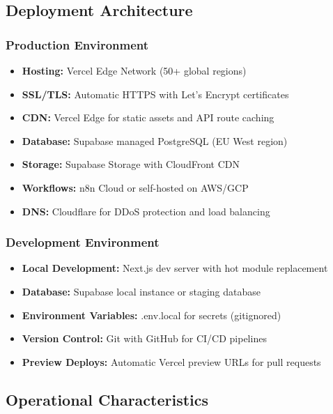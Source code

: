 \documentclass[11pt,a4paper]{article}
\begin{document}
\subsection{Deployment Architecture}

\subsubsection{Production Environment}

\begin{itemize}
  \item \textbf{Hosting:} Vercel Edge Network (50+ global regions)
  \item \textbf{SSL/TLS:} Automatic HTTPS with Let's Encrypt certificates
  \item \textbf{CDN:} Vercel Edge for static assets and API route caching
  \item \textbf{Database:} Supabase managed PostgreSQL (EU West region)
  \item \textbf{Storage:} Supabase Storage with CloudFront CDN
  \item \textbf{Workflows:} n8n Cloud or self-hosted on AWS/GCP
  \item \textbf{DNS:} Cloudflare for DDoS protection and load balancing
\end{itemize}

\subsubsection{Development Environment}

\begin{itemize}
  \item \textbf{Local Development:} Next.js dev server with hot module replacement
  \item \textbf{Database:} Supabase local instance or staging database
  \item \textbf{Environment Variables:} .env.local for secrets (gitignored)
  \item \textbf{Version Control:} Git with GitHub for CI/CD pipelines
  \item \textbf{Preview Deploys:} Automatic Vercel preview URLs for pull requests
\end{itemize}

\subsection{Operational Characteristics}
\end{document}
